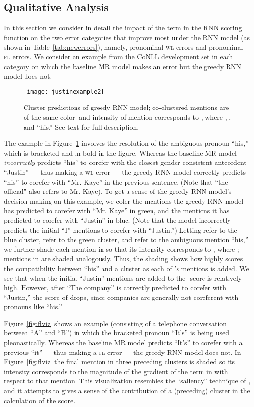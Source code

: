\documentclass[11pt,letterpaper]{article}
\begin{document}
\subsection{Qualitative Analysis}
In this section we consider in detail the impact of the  term in the RNN scoring function on the two error categories that improve most under the RNN model (as shown in Table~\ref{tab:newerrors}), namely, pronominal \textsc{wl} errors and pronominal \textsc{fl} errors. We consider an example from the CoNLL development set in each category on which the baseline MR model makes an error but the greedy RNN model does not.

\begin{figure}[t!]
\centering
\texttt{[image: justinexample2]}
\caption{Cluster predictions of greedy RNN model; co-clustered mentions are of the same color, and intensity of mention  corresponds to , where , , and  ``his.'' See text for full description.}
\label{fig:wlviz}
\end{figure}

The example in Figure~\ref{fig:wlviz} involves the resolution of the ambiguous pronoun ``his,'' which is bracketed and in bold in the figure. Whereas the baseline MR model \textit{incorrectly} predicts ``his'' to corefer with the closest gender-consistent antecedent ``Justin'' --- thus making a \textsc{wl} error --- the greedy RNN model correctly predicts ``his'' to corefer with ``Mr. Kaye'' in the previous sentence. (Note that ``the official'' also refers to Mr. Kaye). To get a sense of the greedy RNN model's decision-making on this example, we color the mentions the greedy RNN model has predicted to corefer with ``Mr. Kaye'' in green, and the mentions it has predicted to corefer with ``Justin'' in blue. (Note that the model incorrectly predicts the initial ``I'' mentions to corefer with ``Justin.'') Letting  refer to the blue cluster,  refer to the green cluster, and  refer to the ambiguous mention ``his,'' we further shade each mention  in  so that its intensity corresponds to , where ; mentions in  are shaded analogously. Thus, the shading shows how highly  scores the compatibility between ``his'' and a cluster  as each of 's mentions is added. We see that when the initial ``Justin'' mentions are added to  the -score is relatively high. However, after ``The company'' is correctly predicted to corefer with ``Justin,'' the score of  drops, since companies are generally not coreferent with pronouns like ``his.''

Figure~\ref{fig:flviz} shows an example (consisting of a telephone conversation between ``A'' and ``B'') in which the bracketed pronoun ``It's'' is being used pleonastically. Whereas the baseline MR model predicts ``It's'' to corefer with a previous ``it'' --- thus making a \textsc{fl} error --- the greedy RNN model does not. In Figure~\ref{fig:flviz} the final mention in three preceding clusters is shaded so its intensity corresponds to the magnitude of the gradient of the  term in  with respect to that mention. This visualization resembles the ``saliency'' technique of , and it attempts to gives a sense of the contribution of a (preceding) cluster in the  calculation of the  score.
\end{document}
